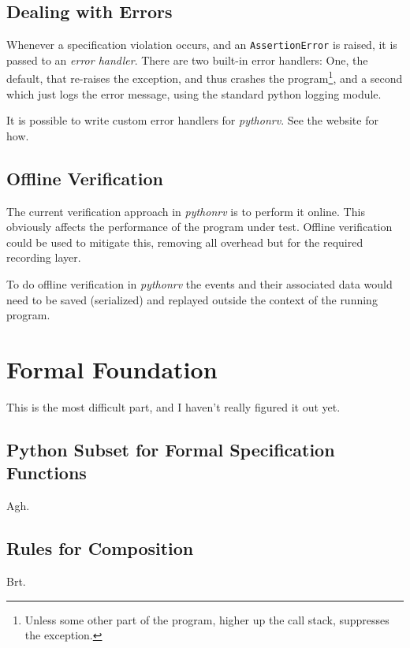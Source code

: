 \documentclass[a4paper,11pt]{kth-mag}
\begin{document}
\subsection{Dealing with Errors}

Whenever a specification violation occurs, and an \texttt{AssertionError} is
raised, it is passed to an \textit{error handler}. There are two built-in error
handlers: One, the default, that re-raises the exception, and thus crashes the
program\footnote{Unless some other part of the program, higher up the call
stack, suppresses the exception.}, and a second which just logs the error
message, using the standard python logging module.

It is possible to write custom error handlers for \textit{pythonrv}. See the
website for how.


\subsection{Offline Verification}

The current verification approach in \textit{pythonrv} is to perform it online.
This obviously affects the performance of the program under test. Offline
verification could be used to mitigate this, removing all overhead but for the
required recording layer.

To do offline verification in \textit{pythonrv} the events and their associated
data would need to be saved (serialized) and replayed outside the context of
the running program.



\section{Formal Foundation} \label{section-approach-formal-foundation}

This is the most difficult part, and I haven't really figured it out yet.


\subsection{Python Subset for Formal Specification Functions}

Agh.


\subsection{Rules for Composition}

Brt.
\end{document}
